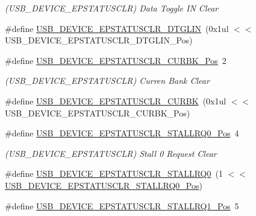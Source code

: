 \begin{DoxyCompactItemize}
\begin{DoxyCompactList}\small\item\em (U\+S\+B\+\_\+\+D\+E\+V\+I\+C\+E\+\_\+\+E\+P\+S\+T\+A\+T\+U\+S\+C\+LR) Data Toggle IN Clear \end{DoxyCompactList}\item 
\#define \mbox{\hyperlink{group___s_a_m_d21___u_s_b_gad87489440e4400d1a42d586cbc227379}{U\+S\+B\+\_\+\+D\+E\+V\+I\+C\+E\+\_\+\+E\+P\+S\+T\+A\+T\+U\+S\+C\+L\+R\+\_\+\+D\+T\+G\+L\+IN}}~(0x1ul $<$$<$ U\+S\+B\+\_\+\+D\+E\+V\+I\+C\+E\+\_\+\+E\+P\+S\+T\+A\+T\+U\+S\+C\+L\+R\+\_\+\+D\+T\+G\+L\+I\+N\+\_\+\+Pos)
\item 
\#define \mbox{\hyperlink{group___s_a_m_d21___u_s_b_ga8fbeed5b3bbc527a317078818e9c02a0}{U\+S\+B\+\_\+\+D\+E\+V\+I\+C\+E\+\_\+\+E\+P\+S\+T\+A\+T\+U\+S\+C\+L\+R\+\_\+\+C\+U\+R\+B\+K\+\_\+\+Pos}}~2
\begin{DoxyCompactList}\small\item\em (U\+S\+B\+\_\+\+D\+E\+V\+I\+C\+E\+\_\+\+E\+P\+S\+T\+A\+T\+U\+S\+C\+LR) Curren Bank Clear \end{DoxyCompactList}\item 
\#define \mbox{\hyperlink{group___s_a_m_d21___u_s_b_ga4a5d43546baf621d2d1b2097e77d8eab}{U\+S\+B\+\_\+\+D\+E\+V\+I\+C\+E\+\_\+\+E\+P\+S\+T\+A\+T\+U\+S\+C\+L\+R\+\_\+\+C\+U\+R\+BK}}~(0x1ul $<$$<$ U\+S\+B\+\_\+\+D\+E\+V\+I\+C\+E\+\_\+\+E\+P\+S\+T\+A\+T\+U\+S\+C\+L\+R\+\_\+\+C\+U\+R\+B\+K\+\_\+\+Pos)
\item 
\#define \mbox{\hyperlink{group___s_a_m_d21___u_s_b_ga4f1e9ab09bf3cd506bd5ca64adbc0e7b}{U\+S\+B\+\_\+\+D\+E\+V\+I\+C\+E\+\_\+\+E\+P\+S\+T\+A\+T\+U\+S\+C\+L\+R\+\_\+\+S\+T\+A\+L\+L\+R\+Q0\+\_\+\+Pos}}~4
\begin{DoxyCompactList}\small\item\em (U\+S\+B\+\_\+\+D\+E\+V\+I\+C\+E\+\_\+\+E\+P\+S\+T\+A\+T\+U\+S\+C\+LR) Stall 0 Request Clear \end{DoxyCompactList}\item 
\#define \mbox{\hyperlink{group___s_a_m_d21___u_s_b_ga900733e0d38598ac30726a777b8d8118}{U\+S\+B\+\_\+\+D\+E\+V\+I\+C\+E\+\_\+\+E\+P\+S\+T\+A\+T\+U\+S\+C\+L\+R\+\_\+\+S\+T\+A\+L\+L\+R\+Q0}}~(1 $<$$<$ \mbox{\hyperlink{group___s_a_m_d21___u_s_b_ga4f1e9ab09bf3cd506bd5ca64adbc0e7b}{U\+S\+B\+\_\+\+D\+E\+V\+I\+C\+E\+\_\+\+E\+P\+S\+T\+A\+T\+U\+S\+C\+L\+R\+\_\+\+S\+T\+A\+L\+L\+R\+Q0\+\_\+\+Pos}})
\item 
\#define \mbox{\hyperlink{group___s_a_m_d21___u_s_b_gaa0343d3270989b59a90ec0ea384d39ec}{U\+S\+B\+\_\+\+D\+E\+V\+I\+C\+E\+\_\+\+E\+P\+S\+T\+A\+T\+U\+S\+C\+L\+R\+\_\+\+S\+T\+A\+L\+L\+R\+Q1\+\_\+\+Pos}}~5
$$
\end{DoxyCompactItemize}

